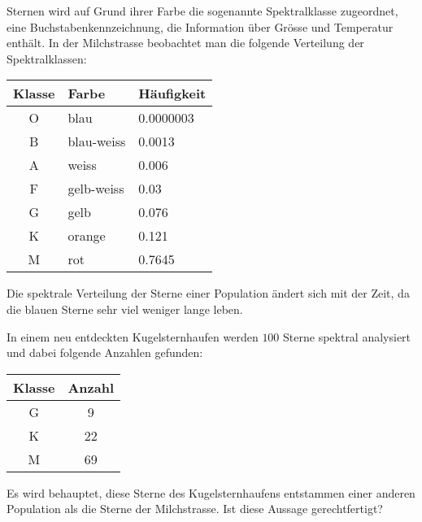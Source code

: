 Sternen wird auf Grund ihrer Farbe die sogenannte Spektralklasse zugeordnet,
eine Buchstabenkennzeichnung, die Information über Grösse und Temperatur
enthält.
In der Milchstrasse beobachtet man die folgende Verteilung
der Spektralklassen:
\begin{center}
\begin{tabular}{|c|l|l|}
\hline
Klasse&Farbe     &Häufigkeit\\
\hline
O     &blau      &0.0000003\\
B     &blau-weiss&0.0013\\
A     &weiss     &0.006\\
F     &gelb-weiss&0.03\\
G     &gelb      &0.076\\
K     &orange    &0.121\\
M     &rot       &0.7645\\
\hline
\end{tabular}
\end{center}
Die spektrale Verteilung der Sterne einer Population ändert sich mit der
Zeit, da die blauen Sterne sehr viel weniger lange leben.

In einem neu entdeckten Kugelsternhaufen werden $100$ Sterne spektral
analysiert und dabei folgende Anzahlen gefunden:
\begin{center}
\begin{tabular}{|c|c|}
\hline
Klasse&Anzahl\\
\hline
G&9\\
K&22\\
M&69\\
\hline
\end{tabular}
\end{center}
Es wird behauptet, diese Sterne des Kugelsternhaufens entstammen einer
anderen Population als die Sterne der Milchstrasse.
Ist diese Aussage gerechtfertigt?



